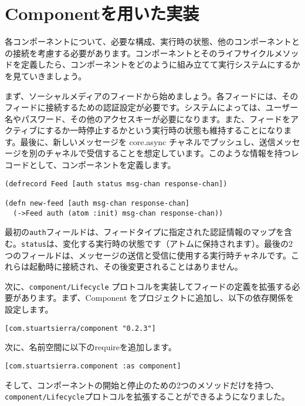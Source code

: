 \section{Componentを用いた実装}

各コンポーネントについて、必要な構成、実行時の状態、他のコンポーネントとの接続を考慮する必要があります。コンポーネントとそのライフサイクルメソッドを定義したら、コンポーネントをどのように組み立てて実行システムにするかを見ていきましょう。

まず、ソーシャルメディアのフィードから始めましょう。各フィードには、そのフィードに接続するための認証設定が必要です。システムによっては、ユーザー名やパスワード、その他のアクセスキーが必要になります。また、フィードをアクティブにするか一時停止するかという実行時の状態も維持することになります。最後に、新しいメッセージを core.async チャネルでプッシュし、送信メッセージを別のチャネルで受信することを想定しています。このような情報を持つレコードとして、コンポーネントを定義します。


\begin{lstlisting}[numbers=none]
(defrecord Feed [auth status msg-chan response-chan])

(defn new-feed [auth msg-chan response-chan]
  (->Feed auth (atom :init) msg-chan response-chan))
\end{lstlisting}

最初の\texttt{auth}フィールドは、フィードタイプに指定された認証情報のマップを含む。\texttt{status}は、変化する実行時の状態です（アトムに保持されます）。最後の2つのフィールドは、メッセージの送信と受信に使用する実行時チャネルです。これらは起動時に接続され、その後変更されることはありません。

次に、\texttt{component/Lifecycle} プロトコルを実装してフィードの定義を拡張する必要があります。まず、Component をプロジェクトに追加し、以下の依存関係を設定します。

\begin{lstlisting}[numbers=none]
[com.stuartsierra/component "0.2.3"]
\end{lstlisting}

次に、名前空間に以下のrequireを追加します。

\begin{lstlisting}[numbers=none]
[com.stuartsierra.component :as component]
\end{lstlisting}

そして、コンポーネントの開始と停止のための2つのメソッドだけを持つ、\texttt{component/Lifecycle}プロトコルを拡張することができるようになりました。


